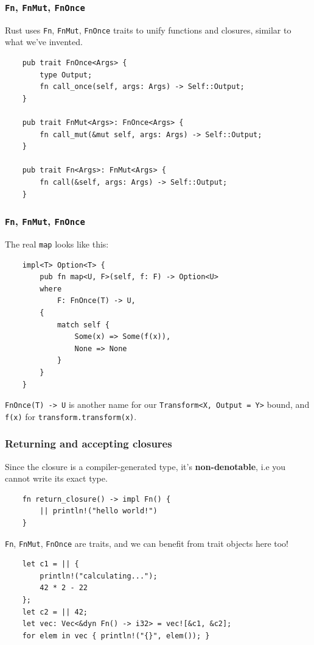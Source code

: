\documentclass[aspectratio=1610,t]{beamer}
\begin{document}
\begin{frame}[fragile,c]
\frametitle{\texttt{Fn}, \texttt{FnMut}, \texttt{FnOnce}}
Rust uses \texttt{Fn}, \texttt{FnMut}, \texttt{FnOnce} traits to unify functions and closures, similar to what we've invented.

\begin{verbatim}
    pub trait FnOnce<Args> {
        type Output;
        fn call_once(self, args: Args) -> Self::Output;
    }

    pub trait FnMut<Args>: FnOnce<Args> {
        fn call_mut(&mut self, args: Args) -> Self::Output;
    }

    pub trait Fn<Args>: FnMut<Args> {
        fn call(&self, args: Args) -> Self::Output;
    }
\end{verbatim}

\end{frame}


\begin{frame}[fragile]
\frametitle{\texttt{Fn}, \texttt{FnMut}, \texttt{FnOnce}}
The real \texttt{map} looks like this:

\begin{verbatim}
    impl<T> Option<T> {
        pub fn map<U, F>(self, f: F) -> Option<U>
        where
            F: FnOnce(T) -> U,
        {
            match self {
                Some(x) => Some(f(x)),
                None => None
            }
        }
    }
\end{verbatim}

\texttt{FnOnce(T) -> U} is another name for our \texttt{Transform<X, Output = Y>} bound, and \texttt{f(x)} for \texttt{transform.transform(x)}.
\end{frame}


\begin{frame}[fragile,c]
\frametitle{Returning and accepting closures}
Since the closure is a compiler-generated type, it's \textbf{non-denotable}, i.e you cannot write its exact type.

\begin{verbatim}
    fn return_closure() -> impl Fn() {
        || println!("hello world!")
    }
\end{verbatim}

\texttt{Fn}, \texttt{FnMut}, \texttt{FnOnce} are traits, and we can benefit from trait objects here too!

\begin{verbatim}
    let c1 = || {
        println!("calculating...");
        42 * 2 - 22
    };
    let c2 = || 42;
    let vec: Vec<&dyn Fn() -> i32> = vec![&c1, &c2];
    for elem in vec { println!("{}", elem()); }
\end{verbatim}
\end{frame}
\end{document}
